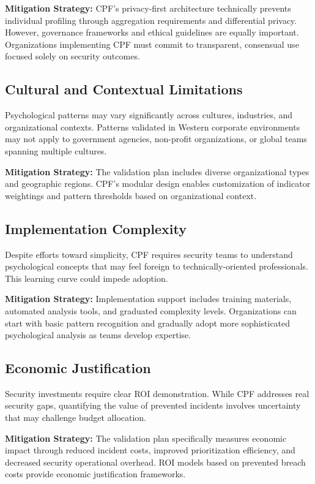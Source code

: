 \documentclass[11pt,a4paper]{article}
\begin{document}
\textbf{Mitigation Strategy:} CPF's privacy-first architecture technically prevents individual profiling through aggregation requirements and differential privacy. However, governance frameworks and ethical guidelines are equally important. Organizations implementing CPF must commit to transparent, consensual use focused solely on security outcomes.

\subsection{Cultural and Contextual Limitations}

Psychological patterns may vary significantly across cultures, industries, and organizational contexts. Patterns validated in Western corporate environments may not apply to government agencies, non-profit organizations, or global teams spanning multiple cultures.

\textbf{Mitigation Strategy:} The validation plan includes diverse organizational types and geographic regions. CPF's modular design enables customization of indicator weightings and pattern thresholds based on organizational context.

\subsection{Implementation Complexity}

Despite efforts toward simplicity, CPF requires security teams to understand psychological concepts that may feel foreign to technically-oriented professionals. This learning curve could impede adoption.

\textbf{Mitigation Strategy:} Implementation support includes training materials, automated analysis tools, and graduated complexity levels. Organizations can start with basic pattern recognition and gradually adopt more sophisticated psychological analysis as teams develop expertise.

\subsection{Economic Justification}

Security investments require clear ROI demonstration. While CPF addresses real security gaps, quantifying the value of prevented incidents involves uncertainty that may challenge budget allocation.

\textbf{Mitigation Strategy:} The validation plan specifically measures economic impact through reduced incident costs, improved prioritization efficiency, and decreased security operational overhead. ROI models based on prevented breach costs provide economic justification frameworks.
\end{document}
